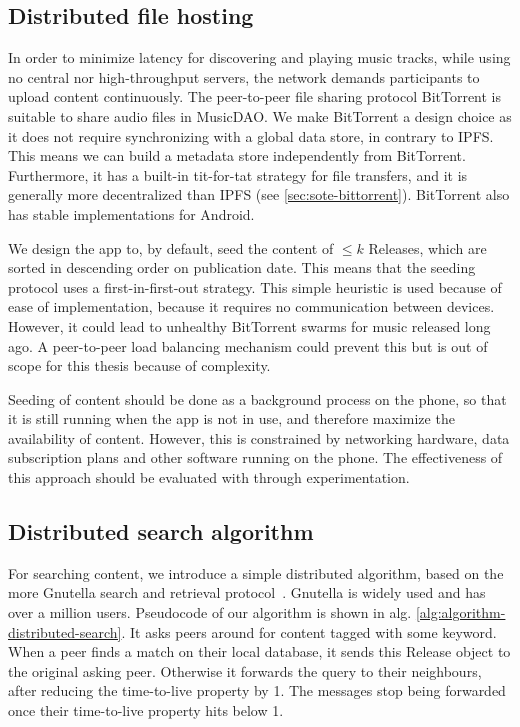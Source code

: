 \subsection{Distributed file hosting}
\label{sec:p2p-music-sharing}
In order to minimize latency for discovering and playing music tracks, while using no central nor high-throughput servers, the network demands participants to upload content continuously. The peer-to-peer file sharing protocol BitTorrent is suitable to share audio files in MusicDAO. We make BitTorrent a design choice as it does not require synchronizing with a global data store, in contrary to IPFS. This means we can build a metadata store independently from BitTorrent. Furthermore, it has a built-in tit-for-tat strategy for file transfers, and it is generally more decentralized than IPFS (see \ref{sec:sote-bittorrent}). BitTorrent also has stable implementations for Android.

We design the app to, by default, seed the content of $\leq k$ Releases, which are sorted in descending order on publication date. This means that the seeding protocol uses a first-in-first-out strategy. This simple heuristic is used because of ease of implementation, because it requires no communication between devices. However, it could lead to unhealthy BitTorrent swarms for music released long ago. A peer-to-peer load balancing mechanism could prevent this but is out of scope for this thesis because of complexity.

Seeding of content should be done as a background process on the phone, so that it is still running when the app is not in use, and therefore maximize the availability of content.  However, this is constrained by networking hardware, data subscription plans and other software running on the phone. The effectiveness of this approach should be evaluated with through experimentation.

\subsection{Distributed search algorithm}
For searching content, we introduce a simple distributed algorithm, based on the more Gnutella search and retrieval protocol~\citep{kronfol2002fasd}. Gnutella is widely used and has over a million users. Pseudocode of our algorithm is shown in alg. \ref{alg:algorithm-distributed-search}. It asks peers around for content tagged with some keyword. When a peer finds a match on their local database, it sends this Release object to the original asking peer. Otherwise it forwards the query to their neighbours, after reducing the time-to-live property by 1. The messages stop being forwarded once their time-to-live property hits below 1. 

